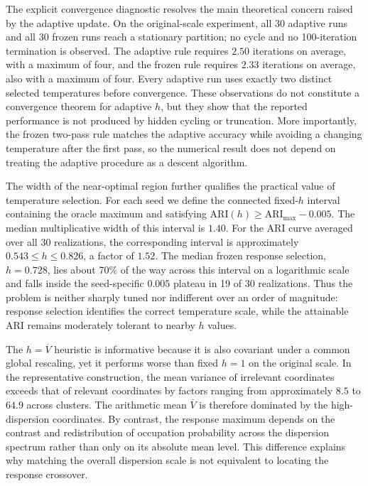 \documentclass[11pt,a4paper]{article}
\theoremstyle{definition}
\theoremstyle{plain}
\begin{document}
The explicit convergence diagnostic resolves the main theoretical concern raised by the adaptive update. On the original-scale experiment, all 30 adaptive runs and all 30 frozen runs reach a stationary partition; no cycle and no 100-iteration termination is observed. The adaptive rule requires $2.50$ iterations on average, with a maximum of four, and the frozen rule requires $2.33$ iterations on average, also with a maximum of four. Every adaptive run uses exactly two distinct selected temperatures before convergence. These observations do not constitute a convergence theorem for adaptive $h$, but they show that the reported performance is not produced by hidden cycling or truncation. More importantly, the frozen two-pass rule matches the adaptive accuracy while avoiding a changing temperature after the first pass, so the numerical result does not depend on treating the adaptive procedure as a descent algorithm.

The width of the near-optimal region further qualifies the practical value of temperature selection. For each seed we define the connected fixed-$h$ interval containing the oracle maximum and satisfying $\mathrm{ARI}(h)\ge\mathrm{ARI}_{\max}-0.005$. The median multiplicative width of this interval is $1.40$. For the ARI curve averaged over all 30 realizations, the corresponding interval is approximately $0.543\le h\le0.826$, a factor of $1.52$. The median frozen response selection, $h=0.728$, lies about 70\% of the way across this interval on a logarithmic scale and falls inside the seed-specific $0.005$ plateau in 19 of 30 realizations. Thus the problem is neither sharply tuned nor indifferent over an order of magnitude: response selection identifies the correct temperature scale, while the attainable ARI remains moderately tolerant to nearby $h$ values.

The $h=\overline V$ heuristic is informative because it is also covariant under a common global rescaling, yet it performs worse than fixed $h=1$ on the original scale. In the representative construction, the mean variance of irrelevant coordinates exceeds that of relevant coordinates by factors ranging from approximately $8.5$ to $64.9$ across clusters. The arithmetic mean $\overline V$ is therefore dominated by the high-dispersion coordinates. By contrast, the response maximum depends on the contrast and redistribution of occupation probability across the dispersion spectrum rather than only on its absolute mean level. This difference explains why matching the overall dispersion scale is not equivalent to locating the response crossover.
\end{document}
